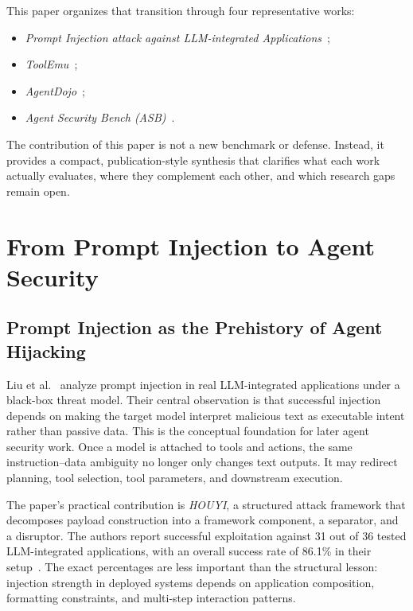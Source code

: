 \documentclass[conference]{IEEEtran}
\begin{document}
This paper organizes that transition through four representative works:
\begin{itemize}[leftmargin=1.5em]
\item \emph{Prompt Injection attack against LLM-integrated Applications}~\cite{liu2023prompt};
\item \emph{ToolEmu}~\cite{ruan2024toolemu};
\item \emph{AgentDojo}~\cite{debenedetti2024agentdojo};
\item \emph{Agent Security Bench (ASB)}~\cite{zhang2025asb}.
\end{itemize}

The contribution of this paper is not a new benchmark or defense. Instead, it provides a compact, publication-style synthesis that clarifies what each work actually evaluates, where they complement each other, and which research gaps remain open.

\section{From Prompt Injection to Agent Security}

\subsection{Prompt Injection as the Prehistory of Agent Hijacking}

Liu et al.~\cite{liu2023prompt} analyze prompt injection in real LLM-integrated applications under a black-box threat model. Their central observation is that successful injection depends on making the target model interpret malicious text as executable intent rather than passive data. This is the conceptual foundation for later agent security work. Once a model is attached to tools and actions, the same instruction--data ambiguity no longer only changes text outputs. It may redirect planning, tool selection, tool parameters, and downstream execution.

The paper's practical contribution is \emph{HOUYI}, a structured attack framework that decomposes payload construction into a framework component, a separator, and a disruptor. The authors report successful exploitation against 31 out of 36 tested LLM-integrated applications, with an overall success rate of 86.1\% in their setup~\cite{liu2023prompt}. The exact percentages are less important than the structural lesson: injection strength in deployed systems depends on application composition, formatting constraints, and multi-step interaction patterns.
\end{document}
